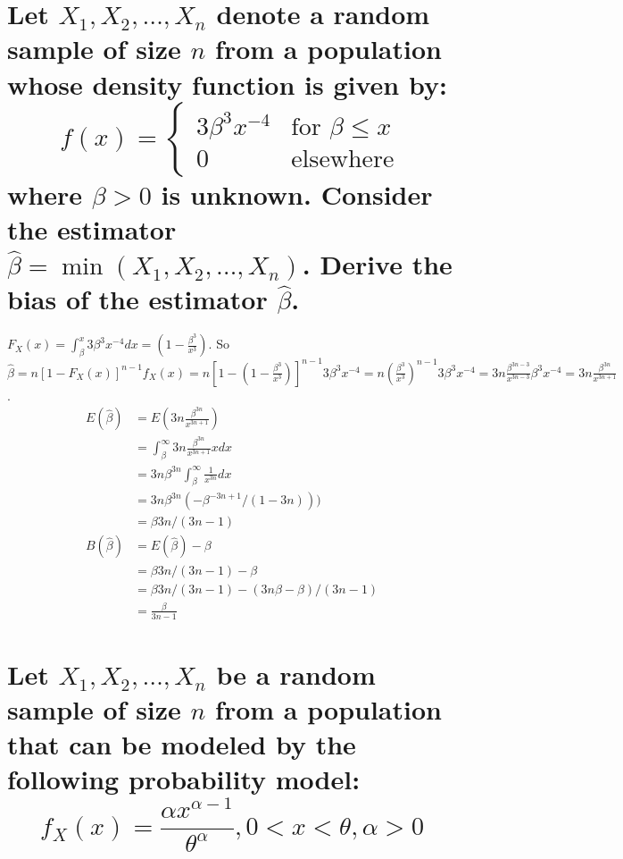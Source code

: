 \documentclass[10pt, letterpaper, titlepage]{article}
\begin{document}
    \section[]{Let $X_1 , X_2 , \hdots , X_n$ denote a random sample of size $n$ from a population whose density function
        is given by:
        \[
            f(x) = \begin{cases}
                3\beta^3 x^{-4} &\text{for } \beta \leq x\\
                0               &\text{elsewhere}
            \end{cases}
        \]
        where $\beta > 0$ is unknown. Consider the estimator\\
        $\hat \beta = \min(X_1 , X_2 , \hdots , X_n)$. 
        Derive the bias of the estimator $\hat \beta$.
        }
        $F_X(x) = \int_\beta^x{3\beta^3 x^{-4}}dx = (1-\frac{\beta^3}{x^3})$. So 
        $\hat \beta = n[1 - F_X(x)]^{n-1} f_X(x) = n[1-(1-\frac{\beta^3}{x^3})]^{n-1}3\beta^3 x^{-4}
        = n (\frac{\beta^3}{x^3})^{n-1}3\beta^3 x^{-4}
        = 3n \frac{\beta^{3n-3}}{x^{3n-3}} \beta^3 x^{-4}
        = 3n\frac{\beta^{3n}}{x^{3n+1}}$.
        \begin{align*}
            E(\hat \beta) &= E(3n\frac{\beta^{3n}}{x^{3n+1}})\\
            &= \int_\beta^\infty{3n\frac{\beta^{3n}}{x^{3n+1}}x}dx\\
            &= 3 n \beta^{3n} \int_\beta^\infty{\frac{1}{x^{3n}}}dx\\
            &= 3 n \beta^{3n} (-\beta^{-3n+1} / (1-3n)))\\
            &= \beta 3n / (3n - 1)\\
            B(\hat \beta) &= E(\hat \beta) - \beta \\
            &= \beta 3n / (3n - 1) - \beta \\
            &= \beta 3n / (3n - 1) - (3n\beta - \beta)/(3n - 1) \\
            &= \frac{\beta}{3n-1}
        \end{align*}

    \newpage
    \section{Let $X_1 , X_2 , \hdots , X_n$ be a random sample of size $n$ from a population that can be modeled
        by the following probability model:
        \[
            f_X(x) = \frac{\alpha x^{\alpha-1}}{\theta^\alpha}, 0 < x <\theta, \alpha > 0
        \]
        }
\end{document}
